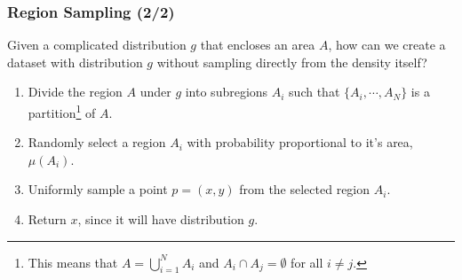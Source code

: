 \documentclass{beamer}
\begin{document}
\begin{frame}
	\frametitle{Region Sampling (2/2)}
	Given a complicated distribution $g$ that encloses an area $A$, how can we create a dataset with distribution $g$ without sampling directly from the density itself?

\begin{theorem}
	\begin{enumerate}
		\item Divide the region $A$ under $g$ into subregions $A_i$ such that $\{A_i, \dotsb, A_N\}$ is a partition\footnote{This means that $A=\bigcup_{i=1}^N A_i$ and $A_i \cap A_j=\emptyset$ for all $i\neq j$.} of $A$.
		\item Randomly select a region $A_i$ with probability proportional to it's area, $\mu(A_i)$.
		\item Uniformly sample a point $p=(x,y)$ from the selected region $A_i$.
		\item Return $x$, since it will have distribution $g$.
	\end{enumerate}
\end{theorem}
\end{frame}
\end{document}
